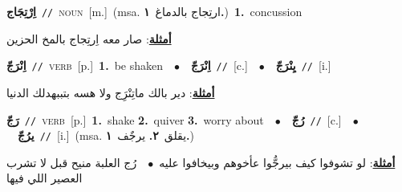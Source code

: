 \documentclass[10pt,a4paper,twoside]{article} %
\begin{document}
\begin{multicols}{2}
{\setlength\topsep{0pt}\textbf{\foreignlanguage{arabic}{اِرْتِجَاج}}\ {\color{gray}\texttt{//}\color{black}}\ \textsc{noun}\ [m.]\ \color{gray}(msa. \foreignlanguage{arabic}{ارتِجاج بالدماغ}~\foreignlanguage{arabic}{\textbf{١.}})\color{black}\ \textbf{1.}~concussion\  \begin{flushright}\color{gray}\foreignlanguage{arabic}{\textbf{\underline{\foreignlanguage{arabic}{أمثلة}}}: صار معه اِرتِجاج بالمخ الحزين}\end{flushright}\color{black}} \vspace{2mm}

{\setlength\topsep{0pt}\textbf{\foreignlanguage{arabic}{اِنْرَجّ}}\ {\color{gray}\texttt{//}\color{black}}\ \textsc{verb}\ [p.]\ \textbf{1.}~be shaken\ \ $\bullet$\ \ \setlength\topsep{0pt}\textbf{\foreignlanguage{arabic}{اِنْرَجّ}}\ {\color{gray}\texttt{//}\color{black}}\ [c.]\ \ $\bullet$\ \ \setlength\topsep{0pt}\textbf{\foreignlanguage{arabic}{يِنْرَجّ}}\ {\color{gray}\texttt{//}\color{black}}\ [i.]\  \begin{flushright}\color{gray}\foreignlanguage{arabic}{\textbf{\underline{\foreignlanguage{arabic}{أمثلة}}}: دير بالك ماتِنْرَِج ولا هسه بتببهدلك الدنيا}\end{flushright}\color{black}} \vspace{2mm}

{\setlength\topsep{0pt}\textbf{\foreignlanguage{arabic}{رَجّ}}\ {\color{gray}\texttt{//}\color{black}}\ \textsc{verb}\ [p.]\ \textbf{1.}~shake  \textbf{2.}~quiver  \textbf{3.}~worry about\ \ $\bullet$\ \ \setlength\topsep{0pt}\textbf{\foreignlanguage{arabic}{رُجّ}}\ {\color{gray}\texttt{//}\color{black}}\ [c.]\ \ $\bullet$\ \ \setlength\topsep{0pt}\textbf{\foreignlanguage{arabic}{يرُجّ}}\ {\color{gray}\texttt{//}\color{black}}\ [i.]\ \color{gray}(msa. \foreignlanguage{arabic}{يقلق}~\foreignlanguage{arabic}{\textbf{٢.}}  \foreignlanguage{arabic}{يرجٌف}~\foreignlanguage{arabic}{\textbf{١.}})\color{black}\  \begin{flushright}\color{gray}\foreignlanguage{arabic}{\textbf{\underline{\foreignlanguage{arabic}{أمثلة}}}: لو تشوفوا كيف بيرجُّوا عأخوهم وبيخافوا عليه\ $\bullet$\ \  رُج العلبة منيح قبل لا تشرب العصير اللي فيها}\end{flushright}\color{black}} \vspace{2mm}


\end{multicols}
\end{document}
